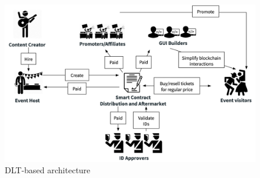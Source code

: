 \begin{figure}[H]
    \centering
    \includegraphics[width=16cm]{figures/dlt-based-landscape.png}
    \caption{DLT-based architecture}
    \label{fig:dlt-based-landscape1}
\end{figure}
